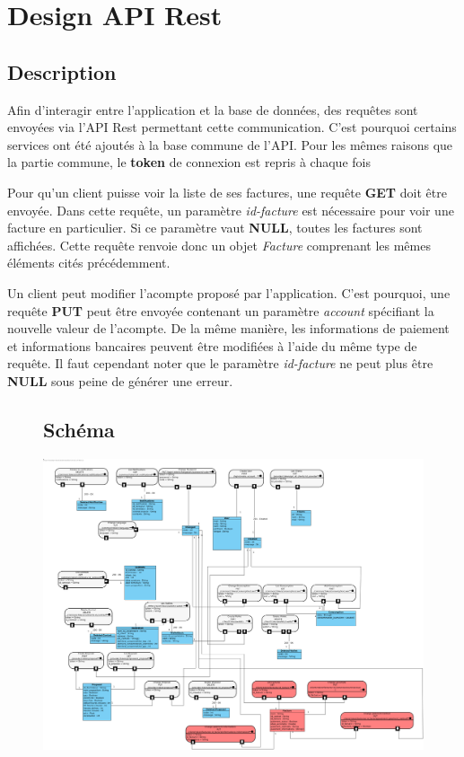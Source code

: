 \section{Design API Rest}
\subsection{Description}

\begin{flushleft}
Afin d'interagir entre l'application et la base de données, des requêtes sont envoyées via l'API Rest permettant cette communication. C'est pourquoi certains services ont été ajoutés à la base commune de l'API.
Pour les mêmes raisons que la partie commune, le \textbf{token} de connexion est repris à chaque fois
\end{flushleft}

\begin{flushleft}
Pour qu'un client puisse voir la liste de ses factures, une requête \textbf{GET} doit être envoyée. Dans cette requête, un paramètre \emph{id-facture} est nécessaire pour voir une facture en particulier. Si ce paramètre vaut \textbf{NULL}, toutes les factures sont affichées.
Cette requête renvoie donc un objet \emph{Facture} comprenant les mêmes éléments cités précédemment.
\end{flushleft}

\begin{flushleft}
Un client peut modifier l'acompte proposé par l'application. C'est pourquoi, une requête \textbf{PUT} peut être envoyée contenant un paramètre \emph{account} spécifiant la nouvelle valeur de l'acompte.
De la même manière, les informations de paiement et informations bancaires peuvent être modifiées à l'aide du même type de requête.
Il faut cependant noter que le paramètre \emph{id-facture} ne peut plus être \textbf{NULL} sous peine de générer une erreur.
\end{flushleft}

\newpage
\begin{figure}[h]
\subsection{Schéma}
\centering
\includegraphics[width = 1.2\textwidth]{extension-maxime/apirest/img/apirest-extension.png}
\end{figure}
